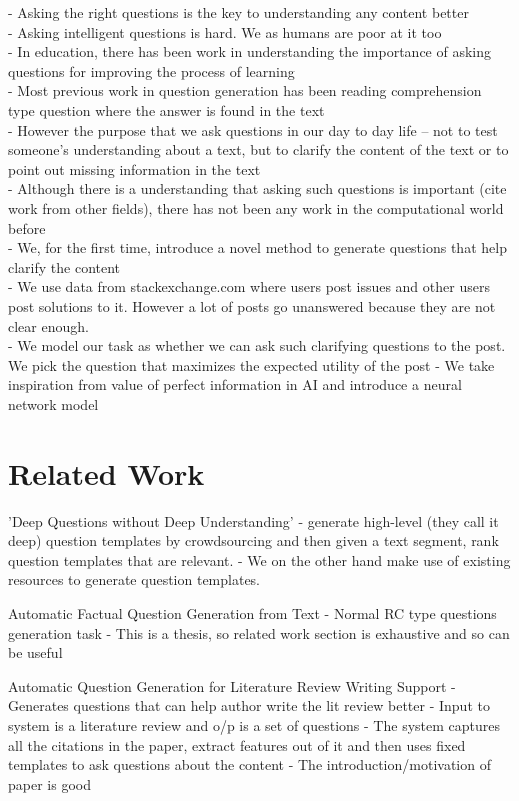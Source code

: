 \documentclass[11pt]{article}
\begin{document}
- Asking the right questions is the key to understanding any content better \\
- Asking intelligent questions is hard. We as humans are poor at it too \\
- In education, there has been work in understanding the importance of asking questions for improving the process of learning \\
- Most previous work in question generation has been reading comprehension type question where the answer is found in the text \\
- However the purpose that we ask questions in our day to day life -- not to test someone's understanding about a text, but to clarify the content of the text or to point out missing information in the text \\
- Although there is a understanding that asking such questions is important (cite work from other fields), there has not been any work in the computational world before \\
- We, for the first time, introduce a novel method to generate questions that help clarify the content \\
- We use data from stackexchange.com where users post issues and other users post solutions to it. However a lot of posts go unanswered because they are not clear enough. \\
- We model our task as whether we can ask such clarifying questions to the post.  We pick the question that maximizes the expected utility of the post
- We take inspiration from value of perfect information in AI and introduce a neural network model 

\section{Related Work} \label{related_work}

'Deep Questions without Deep Understanding' 
- generate high-level (they call it deep) question templates by crowdsourcing and then given a text segment, rank question templates that are relevant. 
- We on the other hand make use of existing resources to generate question templates. 

Automatic Factual Question Generation from Text 
- Normal RC type questions generation task
- This is a thesis, so related work section is exhaustive and so can be useful

Automatic Question Generation for Literature Review Writing Support
- Generates questions that can help author write the lit review better
- Input to system is a literature review and o/p is a set of questions
- The system captures all the citations in the paper, extract features out of it and then uses fixed templates to ask questions about the content
- The introduction/motivation of paper is good
						
\end{document}
